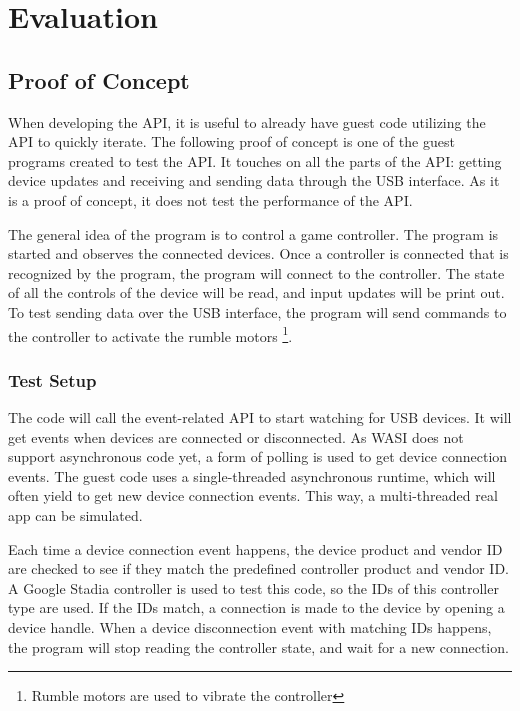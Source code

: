 \chapter{Evaluation}

\section{Proof of Concept}
When developing the API, it is useful to already have guest code utilizing the API to quickly iterate. The following proof of concept is one of the guest programs created to test the API. It touches on all the parts of the API: getting device updates and receiving and sending data through the USB interface. As it is a proof of concept, it does not test the performance of the API.

The general idea of the program is to control a game controller. The program is started and observes the connected devices. Once a controller is connected that is recognized by the program, the program will connect to the controller. The state of all the controls of the device will be read, and input updates will be print out. To test sending data over the USB interface, the program will send commands to the controller to activate the rumble motors \footnote{Rumble motors are used to vibrate the controller}.

\subsection{Test Setup}
The code will call the event-related API to start watching for USB devices. It will get events when devices are connected or disconnected. As WASI does not support asynchronous code yet, a form of polling is used to get device connection events. The guest code uses a single-threaded asynchronous runtime, which will often yield to get new device connection events. This way, a multi-threaded real app can be simulated.

Each time a device connection event happens, the device product and vendor ID are checked to see if they match the predefined controller product and vendor ID. A Google Stadia controller is used to test this code, so the IDs of this controller type are used. If the IDs match, a connection is made to the device by opening a device handle. When a device disconnection event with matching IDs happens, the program will stop reading the controller state, and wait for a new connection.

